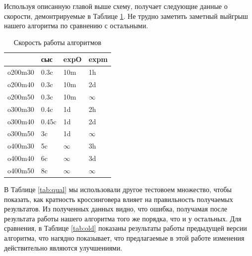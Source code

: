 \documentclass{matmex-diploma-custom}
\begin{document}
Используя описанную главой выше схему, получает следующие данные о
скорости, демонтрируемые в Таблице \ref{tab:perf}. Не трудно заметить
заметный выйгрыш нашего алгоритма по сравнению с остальными.

\begin{table}[h]
  \centering
\begin{tabular}{llll}
\hline
 & сыс & expO & expm \\
\hline
o200m30 & 0.3c & 10m & 1h \\
o200m40 & 0.3c & 10m & 2d \\
o200m50 & 0.3c & 10m & $\infty$ \\
o300m30 & 0.4c & 1d & 2h \\
o300m40 & 0.45c & 1d & 2d \\
o300m50 & 3c & 1d & $\infty$ \\
o400m30 & 5c & $\infty$ & 3h \\
o400m40 & 6c & $\infty$ & 3d \\
o400m50 & 8c & $\infty$ & $\infty$ \\
\hline
\end{tabular}

  \caption{Скорость работы алгоритмов}
  \label{tab:perf}
\end{table}

В Таблице \ref{tab:qual} мы использовали другое тестовоем множество,
чтобы показать, как кратность кроссинговера влияет на правильность
получаемых результатов. Из полученных данных видно, что ошибка,
получамая после результата работы нашего алгоритма того же порядка,
что и у остальных. Для сравнения, в Таблице \ref{tab:old} показаны
результаты работы предыдущей версии алгоритма, что нагядно показывает,
что предлагаемые в этой работе изменения действительно являются
улучшениями.

\end{document}

